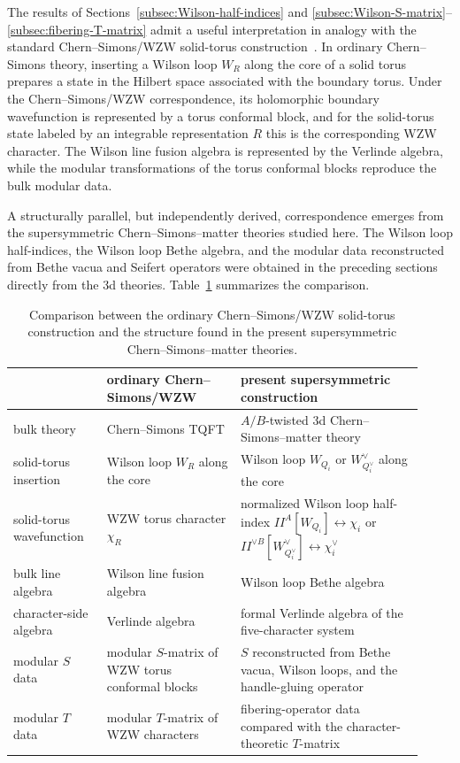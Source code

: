 \documentclass[11pt,a4paper]{article}
\numberwithin{equation}{section}
\begin{document}
The results of Sections~\ref{subsec:Wilson-half-indices} and \ref{subsec:Wilson-S-matrix}--\ref{subsec:fibering-T-matrix} admit a useful interpretation in analogy with the standard Chern--Simons/WZW solid-torus construction~\cite{Witten:1988hf,ElitzurMooreSchwimmerSeiberg:1989}.  In ordinary Chern--Simons theory, inserting a Wilson loop $W_R$ along the core of a solid torus prepares a state in the Hilbert space associated with the boundary torus.  Under the Chern--Simons/WZW correspondence, its holomorphic boundary wavefunction is represented by a torus conformal block, and for the solid-torus state labeled by an integrable representation $R$ this is the corresponding WZW character.  The Wilson line fusion algebra is represented by the Verlinde algebra, while the modular transformations of the torus conformal blocks reproduce the bulk modular data.

A structurally parallel, but independently derived, correspondence emerges from the supersymmetric Chern--Simons--matter theories studied here.  The Wilson loop half-indices, the Wilson loop Bethe algebra, and the modular data reconstructed from Bethe vacua and Seifert operators were obtained in the preceding sections directly from the 3d theories.  Table~\ref{tab:CS-WZW-susy-comparison} summarizes the comparison.

\begin{table}[htbp]
\centering
\footnotesize
\setlength{\tabcolsep}{4pt}
\renewcommand{\arraystretch}{1.12}
\caption{Comparison between the ordinary Chern--Simons/WZW solid-torus construction and the structure found in the present supersymmetric Chern--Simons--matter theories.}
\label{tab:CS-WZW-susy-comparison}
\begin{tabular}{@{}>{\raggedright\arraybackslash}p{0.21\linewidth}>{\raggedright\arraybackslash}p{0.30\linewidth}>{\raggedright\arraybackslash}p{0.41\linewidth}@{}}
\toprule
 & ordinary Chern--Simons/WZW & present supersymmetric construction \\
\midrule
bulk theory
& Chern--Simons TQFT
& $A/B$-twisted 3d Chern--Simons--matter theory \\
solid-torus insertion
& Wilson loop $W_R$ along the core
& Wilson loop $W_{Q_i}$ or $W^\vee_{Q_i^\vee}$ along the core \\
solid-torus wavefunction
& WZW torus character $\chi_R$
& normalized Wilson loop half-index $I\!\!I^A[W_{Q_i}]\leftrightarrow\chi_i$ or $I\!\!I^{\vee B}[W^\vee_{Q_i^\vee}]\leftrightarrow\chi_i^\vee$ \\
bulk line algebra
& Wilson line fusion algebra
& Wilson loop Bethe algebra \\
character-side algebra
& Verlinde algebra
& formal Verlinde algebra of the five-character system \\
modular $S$ data
& modular $S$-matrix of WZW torus conformal blocks
& $S$ reconstructed from Bethe vacua, Wilson loops, and the handle-gluing operator \\
modular $T$ data
& modular $T$-matrix of WZW characters
& fibering-operator data compared with the character-theoretic $T$-matrix \\
\bottomrule
\end{tabular}
\end{table}
\end{document}
